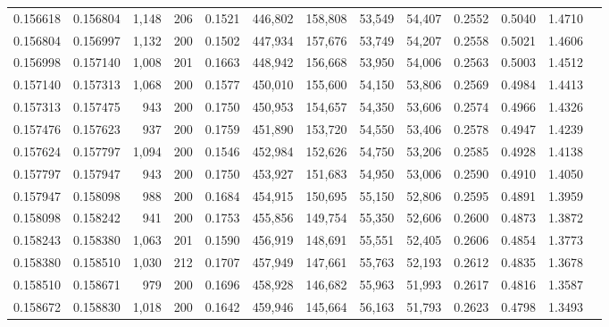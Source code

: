 \begin{tabular}{rrrrrrrrrrrrr}
0.156618 & 0.156804 & 1,148 & 206 &                                     0.1521 & 446,802 & 158,808 &  53,549 &  54,407 & 0.2552 & 0.5040 & 1.4710 \\
0.156804 & 0.156997 & 1,132 & 200 &                                     0.1502 & 447,934 & 157,676 &  53,749 &  54,207 & 0.2558 & 0.5021 & 1.4606 \\
0.156998 & 0.157140 & 1,008 & 201 &                                     0.1663 & 448,942 & 156,668 &  53,950 &  54,006 & 0.2563 & 0.5003 & 1.4512 \\
0.157140 & 0.157313 & 1,068 & 200 &                                     0.1577 & 450,010 & 155,600 &  54,150 &  53,806 & 0.2569 & 0.4984 & 1.4413 \\
0.157313 & 0.157475 &   943 & 200 &                                     0.1750 & 450,953 & 154,657 &  54,350 &  53,606 & 0.2574 & 0.4966 & 1.4326 \\
0.157476 & 0.157623 &   937 & 200 &                                     0.1759 & 451,890 & 153,720 &  54,550 &  53,406 & 0.2578 & 0.4947 & 1.4239 \\
0.157624 & 0.157797 & 1,094 & 200 &                                     0.1546 & 452,984 & 152,626 &  54,750 &  53,206 & 0.2585 & 0.4928 & 1.4138 \\
0.157797 & 0.157947 &   943 & 200 &                                     0.1750 & 453,927 & 151,683 &  54,950 &  53,006 & 0.2590 & 0.4910 & 1.4050 \\
0.157947 & 0.158098 &   988 & 200 &                                     0.1684 & 454,915 & 150,695 &  55,150 &  52,806 & 0.2595 & 0.4891 & 1.3959 \\
0.158098 & 0.158242 &   941 & 200 &                                     0.1753 & 455,856 & 149,754 &  55,350 &  52,606 & 0.2600 & 0.4873 & 1.3872 \\
0.158243 & 0.158380 & 1,063 & 201 &                                     0.1590 & 456,919 & 148,691 &  55,551 &  52,405 & 0.2606 & 0.4854 & 1.3773 \\
0.158380 & 0.158510 & 1,030 & 212 &                                     0.1707 & 457,949 & 147,661 &  55,763 &  52,193 & 0.2612 & 0.4835 & 1.3678 \\
0.158510 & 0.158671 &   979 & 200 &                                     0.1696 & 458,928 & 146,682 &  55,963 &  51,993 & 0.2617 & 0.4816 & 1.3587 \\
0.158672 & 0.158830 & 1,018 & 200 &                                     0.1642 & 459,946 & 145,664 &  56,163 &  51,793 & 0.2623 & 0.4798 & 1.3493 \\

\end{tabular}
